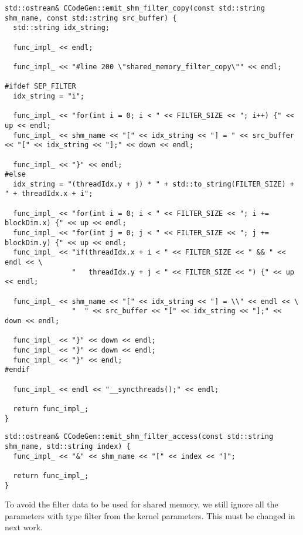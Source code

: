 \documentclass{article}
\begin{document}
\begin{verbatim}
std::ostream& CCodeGen::emit_shm_filter_copy(const std::string shm_name, const std::string src_buffer) {
  std::string idx_string;

  func_impl_ << endl;

  func_impl_ << "#line 200 \"shared_memory_filter_copy\"" << endl;

#ifdef SEP_FILTER
  idx_string = "i";

  func_impl_ << "for(int i = 0; i < " << FILTER_SIZE << "; i++) {" << up << endl;
  func_impl_ << shm_name << "[" << idx_string << "] = " << src_buffer << "[" << idx_string << "];" << down << endl;

  func_impl_ << "}" << endl;
#else
  idx_string = "(threadIdx.y + j) * " + std::to_string(FILTER_SIZE) + " + threadIdx.x + i";

  func_impl_ << "for(int i = 0; i < " << FILTER_SIZE << "; i += blockDim.x) {" << up << endl;
  func_impl_ << "for(int j = 0; j < " << FILTER_SIZE << "; j += blockDim.y) {" << up << endl;
  func_impl_ << "if(threadIdx.x + i < " << FILTER_SIZE << " && " << endl << \
                "   threadIdx.y + j < " << FILTER_SIZE << ") {" << up << endl;

  func_impl_ << shm_name << "[" << idx_string << "] = \\" << endl << \
                "  " << src_buffer << "[" << idx_string << "];" << down << endl;

  func_impl_ << "}" << down << endl;
  func_impl_ << "}" << down << endl;
  func_impl_ << "}" << endl;
#endif

  func_impl_ << endl << "__syncthreads();" << endl;

  return func_impl_;
}
\end{verbatim}

\begin{verbatim}
std::ostream& CCodeGen::emit_shm_filter_access(const std::string shm_name, std::string index) {
  func_impl_ << "&" << shm_name << "[" << index << "]";

  return func_impl_;
}
\end{verbatim}

To avoid the filter data to be used for shared memory, we still ignore all the parameters with type filter from the kernel parameters. This must be changed in next work.
\end{document}
